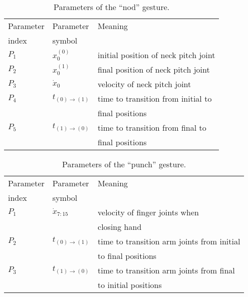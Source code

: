 \begin{table}
\centering
\caption{Parameters of the ``nod'' gesture.}
\begin{tabular}{*{3}{l}} %
\toprule
Parameter       & Parameter         & Meaning \\
index           & symbol            & \\
\midrule
$P_1$           & $x_0^{(0)}$       & initial position of neck pitch joint \\
$P_2$           & $x_0^{(1)}$       & final position of neck pitch joint \\
$P_3$           & $\dot{x}_0$       & velocity of neck pitch joint \\
$P_4$           & $t_{(0)\to(1)}$   & time to transition from initial to \\
                &                   & final positions \\
$P_5$           & $t_{(1)\to(0)}$   & time to transition from final to \\
                &                   & final positions \\
\bottomrule
\end{tabular}
\label{tab:gesture_params:nod}
\end{table}

\begin{table}
\centering
\caption{Parameters of the ``punch'' gesture.}
\begin{tabular}{*{3}{l}} %
\toprule
Parameter       & Parameter         & Meaning \\
index           & symbol            & \\
\midrule
$P_1$           & $\dot{x}_{7:15}$  & velocity of finger joints when \\
                &                   & closing hand \\
$P_2$           & $t_{(0)\to(1)}$   & time to transition arm joints from initial \\
                &                   & to final positions \\
$P_3$           & $t_{(1)\to(0)}$   & time to transition arm joints from final \\
                &                   & to initial positions \\
\bottomrule
\end{tabular}
\label{tab:gesture_params:punch}
\end{table}

